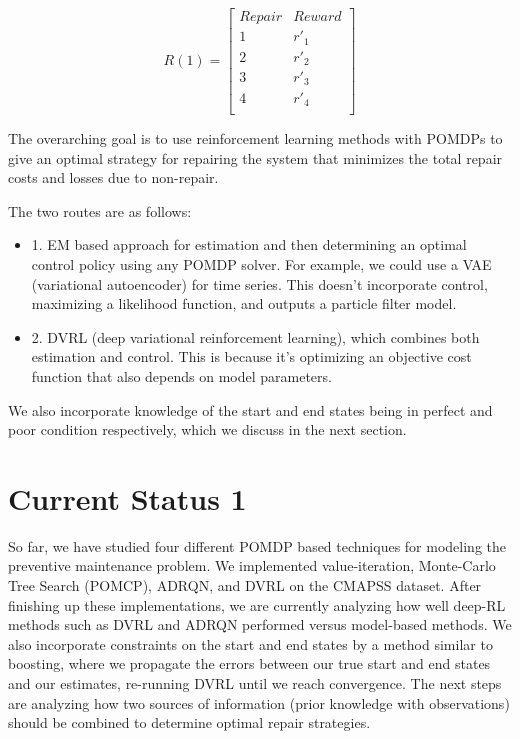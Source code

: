 \documentclass[english]{article}
\numberwithin{equation}{section}
\begin{document}
	$$
	R(1) = 
	\begin{bmatrix}
	Repair & Reward \\
	1 & r'_1 \\
	2 & r'_2 \\
	3 & r'_3 \\
	4 & r'_4 \\
	\end{bmatrix}
	$$
	
	The overarching goal is to use reinforcement learning methods with POMDPs to give an optimal strategy for repairing the system that minimizes the total repair costs and losses due to non-repair.
	
	The two routes are as follows:
	\begin{itemize}
		\item 1. EM based approach for estimation and then determining an optimal control policy using any POMDP solver. For example, we could use a VAE (variational autoencoder) for time series. This doesn't incorporate control, maximizing a likelihood function, and outputs a particle filter model.
		\item 2. DVRL (deep variational reinforcement learning), which combines both estimation and control. This is because it's optimizing an objective cost function that also depends on model parameters.
	\end{itemize}
	
	We also incorporate knowledge of the start and end states being in perfect and poor condition respectively, which we discuss in the next section.
	
	\section*{Current Status 1}
	
	So far, we have studied four different POMDP based techniques for modeling the preventive maintenance problem. We implemented value-iteration, Monte-Carlo Tree Search (POMCP), ADRQN, and DVRL on the CMAPSS dataset. After finishing up these implementations, we are currently analyzing how well deep-RL methods such as DVRL and ADRQN performed versus model-based methods. We also incorporate constraints on the start and end states by a method similar to boosting, where we propagate the errors between our true start and end states and our estimates, re-running DVRL until we reach convergence. The next steps are analyzing how two sources of information (prior knowledge with observations) should be combined to determine optimal repair strategies.
	
\end{document}
